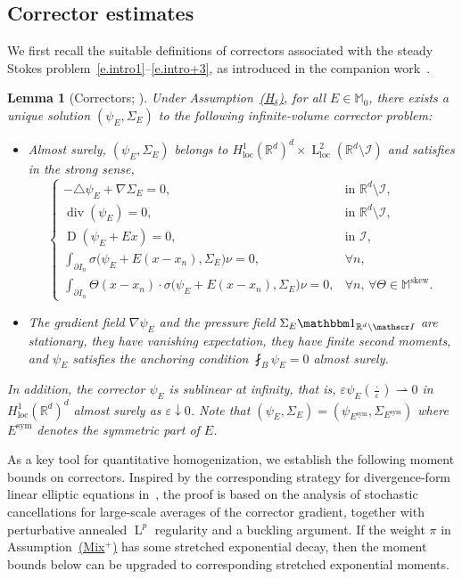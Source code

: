 \documentclass[10pt]{amsart}
\let\mathcal\mathscr
\newcommand{\Hd}{\hyperref[Hd]{\textup{(H$_\delta$)}}\xspace}
\newcommand{\Mix}{\hyperref[Mix+]{\textup{(Mix$^+$)}}\xspace}
\let\mathds\mathbbm
\theoremstyle{plain}
\newtheorem{lem1}[theor1]{Lemma}
\theoremstyle{definition}
\newcommand{\e}{\varepsilon}
\newcommand{\R}{\mathbb R}
\newcommand{\Ic}{\mathcal I}
\newcommand{\Md}{\mathbb M}
\newcommand{\cvf}{\rightharpoonup}
\newcommand{\loc}{{\operatorname{loc}}}
\newcommand{\D}{\operatorname{D}}
\newcommand{\Ld}{\operatorname{L}}
\newcommand{\Div}{{\operatorname{div}}}
\newcommand{\Sym}{{\operatorname{sym}}}
\newcommand{\Skew}{{\operatorname{skew}}}
\begin{document}
\subsection{Corrector estimates}

We first recall the suitable definitions of correctors associated with the steady Stokes problem~\eqref{e.intro1}--\eqref{e.intro+3}, as introduced in the companion work~\cite[Prop.\,2.1]{DG-19}.

\begin{lem1}[Correctors; \cite{DG-19}]\label{lem:cor}
Under Assumption~\Hd, for all $E\in\Md_0$, there exists a unique solution $(\psi_E,\Sigma_E)$ to the following infinite-volume corrector problem:
\begin{itemize}
\item Almost surely, $(\psi_E,\Sigma_E)$ belongs to $H^1_\loc(\R^d)^d\times\Ld^2_\loc(\R^d\setminus\Ic)$ and satisfies in the strong sense,
\begin{equation}\label{eq:corr-Stokes}
\begin{cases}
-\triangle\psi_E+\nabla\Sigma_E=0,&\text{in $\R^d\setminus\Ic$},\\
\Div(\psi_E)=0,&\text{in $\R^d\setminus\Ic$},\\
\D(\psi_E+Ex)=0,
&\text{in $\Ic$},\\
\int_{\partial I_n}\sigma\big(\psi_E+E(x-x_n),\Sigma_E\big)\nu=0,&\forall n,\\
\int_{\partial I_n}\Theta(x-x_n)\cdot\sigma\big(\psi_E+E(x-x_n),\Sigma_E\big)\nu=0,&\forall n,\,\forall\Theta\in\Md^\Skew.
\end{cases}
\end{equation}
\item The gradient field $\nabla\psi_E$ and the pressure field $\Sigma_E\mathds1_{\R^d\setminus\Ic}$ are stationary, they have vanishing expectation, they have finite second moments, and $\psi_E$ satisfies the anchoring condition $\fint_B \psi_E=0$ almost surely.
\end{itemize}
In addition, the corrector $\psi_E$ is sublinear at infinity, that is, $\e\psi_E(\frac\cdot\e)\cvf{}0$ in $H^1_\loc(\R^d)^d$ almost surely as $\e\downarrow0$. Note that $(\psi_E,\Sigma_E)=(\psi_{E^\Sym},\Sigma_{E^\Sym})$ where $E^\Sym$ denotes the symmetric part of $E$.
\end{lem1}

As a key tool for quantitative homogenization, we establish the following moment bounds on correctors.
Inspired by the corresponding strategy for divergence-form linear elliptic equations in~\cite{JO}, the proof is based on the analysis of stochastic cancellations for large-scale averages of the corrector gradient, together with perturbative annealed $\Ld^p$ regularity and a buckling argument.
If the weight $\pi$ in Assumption~\Mix has some stretched exponential decay, then the moment bounds below can be upgraded to corresponding stretched exponential moments.
\end{document}
